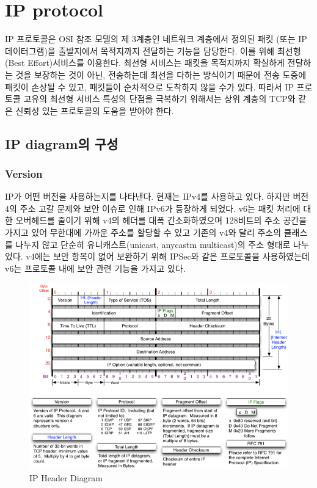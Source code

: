 \section{IP protocol}
IP 프로토콜은 OSI 참조 모델의 제 3계층인 네트워크 계층에서 정의된 패킷 (또는 IP 데이터그램)을 출발지에서 목적지까지 전달하는 기능을 담당한다. 이를 위해 최선형(Best Effort)서비스를 이용한다. 최선형 서비스는 패킷을 목적지까지 확실하게 전달하는 것을 보장하는 것이 아닌, 전송하는데 최선을 다하는 방식이기 때문에 전송 도중에 패킷이 손상될 수 있고, 패킷들이 순차적으로 도착하지 않을 수가 있다. 따라서 IP 프로토콜 고유의 최선형 서비스 특성의 단점을 극복하기 위해서는 상위 계층의 TCP와 같은 신뢰성 있는 프로토콜의 도움을 받아야 한다.
\subsection{IP diagram의 구성}
    \subsubsection*{Version }
    IP가 어떤 버전을 사용하는지를 나타낸다. 현재는 IPv4를 사용하고 있다. 하지만 버전 4의 주소 고갈 문제와 보안 이슈로 인해 IPv6가 등장하게 되었다. v6는 패킷 처리에 대한 오버헤드를 줄이기 위해 v4의 헤더를 대폭 간소화하였으며 128비트의 주소 공간을 가지고 있어 무한대에 가까운 주소를 할당할 수 있고 기존의 v4와 달리 주소의 클래스를 나누지 않고 단순히 유니캐스트(unicast, anycastm multicast)의 주소 형태로 나누었다. v4에는 보안 항목이 없어 보완하기 위해 IPSec와 같은 프로토콜을 사용하였는데 v6는 프로토콜 내에 보안 관련 기능을 가지고 있다.

    \vspace{-4mm}  
    \begin{figure}[!h]\centering
		\includegraphics[width=.9\textwidth]{image/week01/3-1-1.png}
		\caption{\small IP Header Diagram}
		\vspace{-10pt}
    \end{figure}
   \vspace{-4mm}  
    
